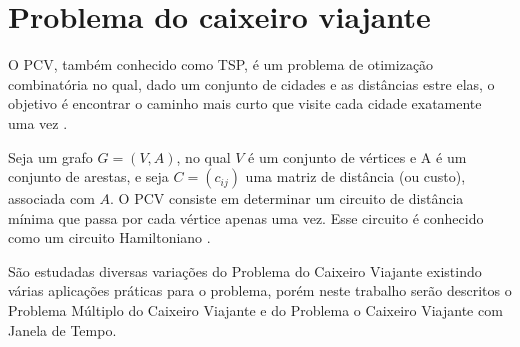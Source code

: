 


\section{Problema do caixeiro viajante}

O \ac{PCV}, também conhecido como \ac{TSP}, é um problema de otimização combinatória no qual, dado um conjunto de cidades e as distâncias estre elas, o objetivo é encontrar o caminho mais curto que visite cada cidade exatamente uma vez \cite{goyal:2010}.

Seja um grafo $G = (V,A)$, no qual $V$ é um conjunto de vértices e A é um conjunto de arestas, e seja $C = (c_{ij})$ uma matriz de distância (ou custo), associada com $A$. O \ac{PCV} consiste em determinar um circuito de distância mínima que passa por cada vértice apenas uma vez. Esse circuito é conhecido como um circuito Hamiltoniano \cite{laporte:1992}.

São estudadas diversas variações do Problema do Caixeiro Viajante existindo várias aplicações práticas para o problema, porém neste trabalho serão descritos o Problema Múltiplo do Caixeiro Viajante e do Problema o Caixeiro Viajante com Janela de Tempo. 


